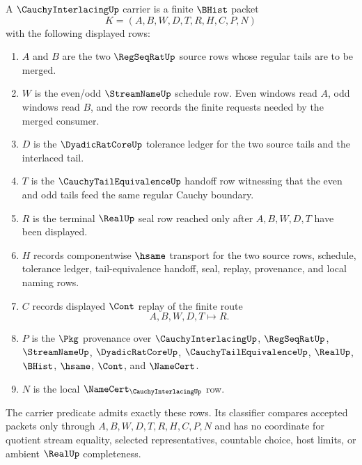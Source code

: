 \begin{definition}
\label{def:cauchy-interlacing-carrier}
A $\CauchyInterlacingUp$ carrier is a finite $\BHist$ packet
$$
K=(A,B,W,D,T,R,H,C,P,N)
$$
with the following displayed rows:
\begin{enumerate}
\item $A$ and $B$ are the two $\RegSeqRatUp$ source rows whose regular tails are to be merged.
\item $W$ is the even/odd $\StreamNameUp$ schedule row. Even windows read $A$, odd windows read $B$, and the row records the finite requests needed by the merged consumer.
\item $D$ is the $\DyadicRatCoreUp$ tolerance ledger for the two source tails and the interlaced tail.
\item $T$ is the $\CauchyTailEquivalenceUp$ handoff row witnessing that the even and odd tails feed the same regular Cauchy boundary.
\item $R$ is the terminal $\RealUp$ seal row reached only after $A,B,W,D,T$ have been displayed.
\item $H$ records componentwise $\hsame$ transport for the two source rows, schedule, tolerance ledger, tail-equivalence handoff, seal, replay, provenance, and local naming rows.
\item $C$ records displayed $\Cont$ replay of the finite route
$$
A,B,W,D,T \longmapsto R .
$$
\item $P$ is the $\Pkg$ provenance over $\CauchyInterlacingUp$, $\RegSeqRatUp$, $\StreamNameUp$, $\DyadicRatCoreUp$, $\CauchyTailEquivalenceUp$, $\RealUp$, $\BHist$, $\hsame$, $\Cont$, and $\NameCert$.
\item $N$ is the local $\NameCert_{\CauchyInterlacingUp}$ row.
\end{enumerate}
The carrier predicate admits exactly these rows. Its classifier compares accepted packets only through $A,B,W,D,T,R,H,C,P,N$ and has no coordinate for quotient stream equality, selected representatives, countable choice, host limits, or ambient $\RealUp$ completeness.
\end{definition}


